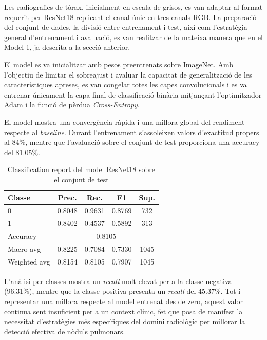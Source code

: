 \documentclass[conference]{IEEEtran}
\begin{document}
Les radiografies de tòrax, inicialment en escala de grisos, es van adaptar al format requerit per ResNet18 replicant el canal únic en tres canals RGB. La preparació del conjunt de dades, la divisió entre entrenament i test, així com l’estratègia general d’entrenament i avaluació, es van realitzar de la mateixa manera que en el Model 1, ja descrita a la secció anterior.

El model es va inicialitzar amb pesos preentrenats sobre ImageNet. Amb l’objectiu de limitar el sobreajust i avaluar la capacitat de generalització de les característiques apreses, es van congelar totes les capes convolucionals i es va entrenar únicament la capa final de classificació binària mitjançant l’optimitzador Adam i la funció de pèrdua \textit{Cross-Entropy}.

El model mostra una convergència ràpida i una millora global del rendiment respecte al \textit{baseline}. Durant l’entrenament s’assoleixen valors d’exactitud propers al 84\%, mentre que l’avaluació sobre el conjunt de test proporciona una accuracy del 81.05\%.

\begin{table}[H]
\caption{Classification report del model ResNet18 sobre el conjunt de test}
\label{tab:resnet_report}
\centering
\footnotesize
\setlength{\tabcolsep}{3pt}
\begin{tabular}{lcccc}
\toprule
\textbf{Classe} & \textbf{Prec.} & \textbf{Rec.} & \textbf{F1} & \textbf{Sup.} \\
\midrule
0 & 0.8048 & 0.9631 & 0.8769 & 732 \\
1 & 0.8402 & 0.4537 & 0.5892 & 313 \\
\midrule
Accuracy     & \multicolumn{4}{c}{0.8105} \\
Macro avg    & 0.8225 & 0.7084 & 0.7330 & 1045 \\
Weighted avg & 0.8154 & 0.8105 & 0.7907 & 1045 \\
\bottomrule
\end{tabular}
\end{table}

L’anàlisi per classes mostra un \textit{recall} molt elevat per a la classe negativa (96.31\%), mentre que la classe positiva presenta un \textit{recall} del 45.37\%. Tot i representar una millora respecte al model entrenat des de zero, aquest valor continua sent insuficient per a un context clínic, fet que posa de manifest la necessitat d’estratègies més específiques del domini radiològic per millorar la detecció efectiva de nòduls pulmonars.
\end{document}
